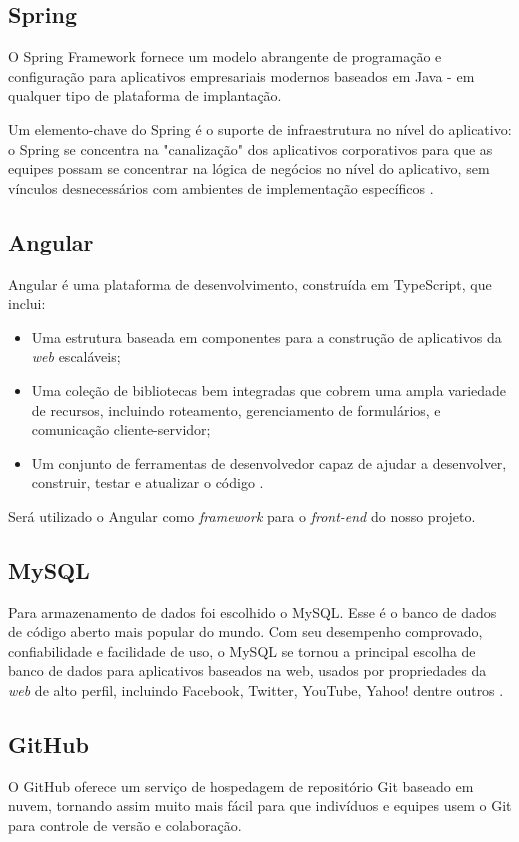 \documentclass[
    12pt,               %
    openright,          %
    oneside,
    a4paper,            %
    paginasA3,  %
    MODELO,             %
    TODO,               %
    english,            %
    brazil              %
    ]{ifsp-spo-inf-ctds} %
\begin{document}
\subsection{Spring}
O Spring Framework fornece um modelo abrangente de programação e configuração para aplicativos empresariais modernos baseados em Java - em qualquer tipo de plataforma de implantação.

Um elemento-chave do Spring é o suporte de infraestrutura no nível do aplicativo: o Spring se concentra na "canalização" dos aplicativos corporativos para que as equipes possam se concentrar na lógica de negócios no nível do aplicativo, sem vínculos desnecessários com ambientes de implementação específicos \cite{spring:2021}.

\subsection {Angular}
Angular é uma plataforma de desenvolvimento, construída em 
TypeScript, que inclui:
\begin{itemize}
\item Uma estrutura baseada em componentes para a construção de aplicativos da \textit{web} escaláveis;
\item Uma coleção de bibliotecas bem integradas que cobrem uma ampla variedade de recursos, incluindo roteamento, gerenciamento de formulários, e comunicação cliente-servidor;
\item Um conjunto de ferramentas de desenvolvedor capaz de ajudar a desenvolver, construir, testar e atualizar o código \cite{angular:2021}.
\end{itemize}

Será utilizado o Angular como \textit{framework} para o \textit{front-end} do nosso projeto.

\subsection{MySQL}
Para armazenamento de dados foi escolhido o MySQL. Esse é o banco de dados de código aberto mais popular do mundo. Com seu desempenho comprovado, confiabilidade e facilidade de uso, o MySQL se tornou a principal escolha de banco de dados para aplicativos baseados na web, usados por propriedades da \textit{web} de alto perfil, incluindo Facebook, Twitter, YouTube, Yahoo! dentre outros \cite{mysql:2021}.

\subsection{GitHub}
O GitHub oferece um serviço de hospedagem de repositório Git baseado em nuvem, tornando assim muito mais fácil para que indivíduos e equipes usem o Git para controle de versão e colaboração.
\end{document}
